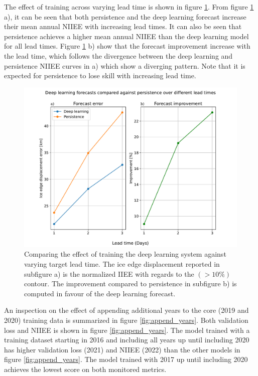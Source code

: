 \documentclass[../main/thesis]{subfiles}
\begin{document}
The effect of training across varying lead time is shown in figure \ref{fig:lead_times}. From figure \ref{fig:lead_times} a), it can be seen that both persistence and the deep learning forecast increase their mean annual NIIEE with increasing lead times. It can also be seen that persistence achieves a higher mean annual NIIEE than the deep learning model for all lead times. Figure \ref{fig:lead_times} b) show that the forecast improvement increase with the lead time, which follows the divergence between the deep learning and persistence NIIEE curves in a) which show a diverging pattern. Note that it is expected for persistence to lose skill with increasing lead time.

\begin{figure}
    \centering
    \includegraphics[width=\textwidth]{lead_times.pdf}
    \caption{\label{fig:lead_times}Comparing the effect of training the deep learning system against varying target lead time. The ice edge displacement reported in subfigure a) is the normalized IIEE with regards to the $(> 10\%)$ contour. The improvement compared to persistence in subfigure b) is computed in favour of the deep learning forecast.}
\end{figure}

An inspection on the effect of appending additional years to the core (2019 and 2020) training data is summarized in figure \ref{fig:append_years}. Both validation loss and NIIEE is shown in figure \ref{fig:append_years}. The model trained with a training dataset starting in 2016 and including all years up until including 2020 has higher validation loss (2021) and NIIEE (2022) than the other models in figure \ref{fig:append_years}. The model trained with 2017 up until including 2020 achieves the lowest score on both monitored metrics.
\end{document}
